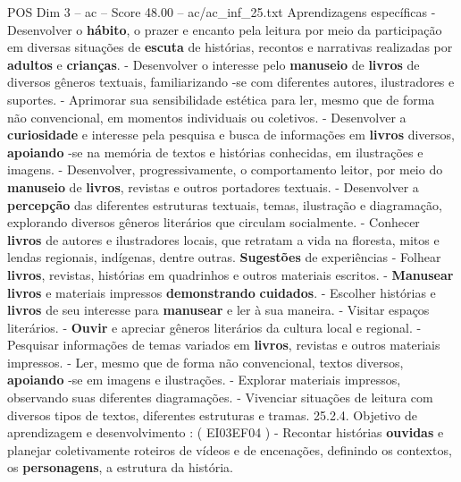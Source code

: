 \begin{textsample}{POS Dim 3 – ac – Score 48.00 – ac/ac\_inf\_25.txt}
Aprendizagens específicas - Desenvolver o \textbf{hábito}, o prazer e encanto pela leitura por meio da participação em diversas situações de \textbf{escuta} de histórias, recontos e narrativas realizadas por \textbf{adultos} e \textbf{crianças}. - Desenvolver o interesse pelo \textbf{manuseio} de \textbf{livros} de diversos gêneros textuais, familiarizando -se com diferentes autores, ilustradores e suportes. - Aprimorar sua sensibilidade estética para ler, mesmo que de forma não convencional, em momentos individuais ou coletivos. - Desenvolver a \textbf{curiosidade} e interesse pela pesquisa e busca de informações em \textbf{livros} diversos, \textbf{apoiando} -se na memória de textos e histórias conhecidas, em ilustrações e imagens. - Desenvolver, progressivamente, o comportamento leitor, por meio do \textbf{manuseio} de \textbf{livros}, revistas e outros portadores textuais. - Desenvolver a \textbf{percepção} das diferentes estruturas textuais, temas, ilustração e diagramação, explorando diversos gêneros literários que circulam socialmente. - Conhecer \textbf{livros} de autores e ilustradores locais, que retratam a vida na floresta, mitos e lendas regionais, indígenas, dentre outras. \textbf{Sugestões} de experiências - Folhear \textbf{livros}, revistas, histórias em quadrinhos e outros materiais escritos. - \textbf{Manusear} \textbf{livros} e materiais impressos \textbf{demonstrando} \textbf{cuidados}. - Escolher histórias e \textbf{livros} de seu interesse para \textbf{manusear} e ler à sua maneira. - Visitar espaços literários. - \textbf{Ouvir} e apreciar gêneros literários da cultura local e regional. - Pesquisar informações de temas variados em \textbf{livros}, revistas e outros materiais impressos. - Ler, mesmo que de forma não convencional, textos diversos, \textbf{apoiando} -se em imagens e ilustrações. - Explorar materiais impressos, observando suas diferentes diagramações. - Vivenciar situações de leitura com diversos tipos de textos, diferentes estruturas e tramas. 25.2.4.
Objetivo de aprendizagem e desenvolvimento : ( EI03EF04 ) - Recontar histórias \textbf{ouvidas} e planejar coletivamente roteiros de vídeos e de encenações, definindo os contextos, os \textbf{personagens}, a estrutura da história.

\end{textsample}
